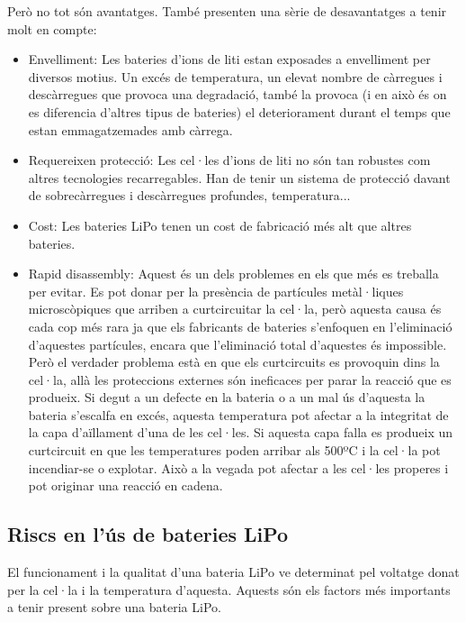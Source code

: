 Però no tot són avantatges. També presenten una sèrie de desavantatges a tenir molt en compte:
\begin{itemize}
    \item Envelliment: Les bateries d'ions de liti estan exposades a envelliment per diversos motius. Un excés de temperatura, un elevat nombre de càrregues i descàrregues que provoca una degradació, també la provoca (i en això és on es diferencia d'altres tipus de bateries) el deteriorament durant el temps que estan emmagatzemades amb càrrega. 
    \item Requereixen protecció: Les cel·les d'ions de liti no són tan robustes com altres tecnologies recarregables. Han de tenir un sistema de protecció davant de sobrecàrregues i descàrregues profundes, temperatura...
    \item Cost: Les bateries LiPo tenen un cost de fabricació més alt que altres bateries.
    \item Rapid disassembly: Aquest és un dels problemes en els que més es treballa per evitar. Es pot donar per la presència de partícules metàl·liques microscòpiques que arriben a curtcircuitar la cel·la, però aquesta causa és cada cop més rara ja que els fabricants de bateries s'enfoquen en l'eliminació d'aquestes partícules, encara que l'eliminació total d'aquestes és impossible. Però el verdader problema està en que els curtcircuits es provoquin dins la cel·la, allà les proteccions externes són ineficaces per parar la reacció que es produeix. Si degut a un defecte en la bateria o a un mal ús d'aquesta la bateria s'escalfa en excés, aquesta temperatura pot afectar a la integritat de la capa d'aïllament d'una de les cel·les. Si aquesta capa falla es produeix un curtcircuit en que les temperatures poden arribar als 500ºC i la cel·la pot incendiar-se o explotar. Això a la vegada pot afectar a les cel·les properes i pot originar una reacció en cadena. 
\end{itemize}

\subsection{Riscs en l'ús de bateries LiPo}

El funcionament i la qualitat d'una bateria LiPo ve determinat pel \newline voltatge donat per la cel·la i la temperatura d'aquesta. Aquests són els factors més importants a tenir present sobre una bateria LiPo. 

